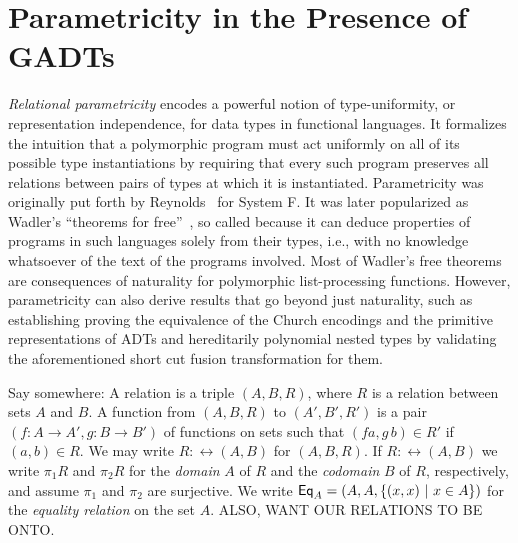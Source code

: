 \documentclass[acmsmall,screen,review,anonymous]{acmart}
\theoremstyle{definition}
\begin{document}
\section{Parametricity in the Presence of GADTs}\label{sec:par}

{\em Relational parametricity} encodes a powerful notion of
type-uniformity, or representation independence, for data types in
functional languages. It formalizes the intuition that a polymorphic
program must act uniformly on all of its possible type instantiations
by requiring that every such program preserves all relations between
pairs of types at which it is instantiated. Parametricity was
originally put forth by Reynolds~\cite{rey83} for System F. It was
later popularized as Wadler's ``theorems for free''~\cite{wad89}, so
called because it can deduce properties of programs in such languages
solely from their types, i.e., with no knowledge whatsoever of the
text of the programs involved.  Most of Wadler's free theorems are
consequences of naturality for polymorphic list-processing
functions. However, parametricity can also derive results that go
beyond just naturality, such as establishing {\color{blue} proving}
the equivalence of the Church encodings and the primitive
representations of ADTs and {\color{blue} hereditarily polynomial}
nested types by validating the aforementioned short cut fusion
transformation for them.

{\color{blue} Say somewhere: A relation is a triple $(A,B,R)$, where
  $R$ is a relation between sets $A$ and $B$.  A function from
  $(A,B,R)$ to $(A',B',R')$ is a pair $(f : A \to A',g : B \to B')$ of
  functions on sets such that $(f a,g\,b) \in R'$ if $(a,b) \in R$. We
  may write $R : \rel(A,B)$ for $(A,B,R)$.  If $R : \rel(A,B)$ we
  write $\pi_1 R$ and $\pi_2 R$ for the {\em domain} $A$ of $R$ and
  the {\em codomain} $B$ of $R$, respectively, and assume $\pi_1$ and
  $\pi_2$ are surjective. We write $\mathsf{Eq}_A = (A,A,\{(x,x)~|~ x \in
  A\})$ for the {\em equality relation} on the set $A$. ALSO, WANT OUR
RELATIONS TO BE ONTO.}
\end{document}
